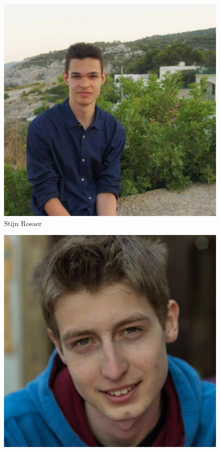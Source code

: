 \begin{frame}
\begin{figure}
\begin{minipage}{0.3\linewidth}
				\includegraphics[width=\linewidth]{res/stijn} \\
            	\footnotesize Stijn Rosaer
        	\end{minipage}
            \begin{minipage}{0.3\linewidth}
            	\centering
				\includegraphics[width=\linewidth]{res/igor} \\

\end{minipage}
\end{figure}
\end{frame}

